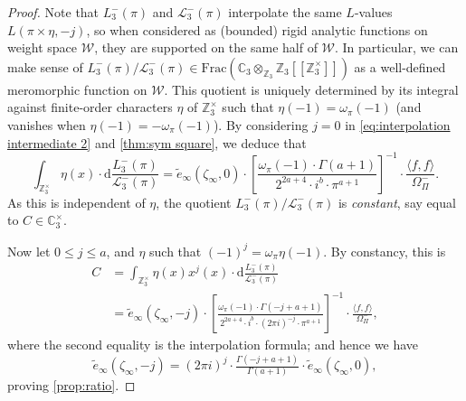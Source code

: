 \documentclass[10pt,a4paper]{amsart}
\newcommand{\C}{\mathbb{C}}
\newcommand{\Z}{\mathbb{Z}}
\newcommand{\cL}{\mathcal{L}}
\newcommand{\sW}{\mathscr{W}}
\begin{document}
\begin{proof}
Note that $L_3^-(\pi)$ and $\cL_3^-(\pi)$ interpolate the same $L$-values $L(\pi\times\eta,-j)$, so when considered as (bounded) rigid analytic functions on weight space $\sW$, they are supported on the same half of $\sW$. In particular, we can make sense of $L_3^-(\pi)/\cL_3^-(\pi) \in \mathrm{Frac}(\C_3\otimes_{\Z_3}\Z_3[\![\Z_3^\times]\!])$ as a well-defined meromorphic function on $\sW$. This quotient is uniquely determined by its integral against finite-order characters $\eta$ of $\Z_3^\times$ such that $\eta(-1) = \omega_\pi(-1)$ (and vanishes when $\eta(-1) = - \omega_\pi(-1)$). By considering $j = 0$ in \eqref{eq:interpolation intermediate 2} and \cref{thm:sym square}, we deduce that
\[
\int_{\Z_3^\times} \eta(x) \cdot \mathrm{d}\frac{L_3^-(\pi)}{\cL_3^-(\pi)} =  \widetilde{e}_\infty(\zeta_\infty,0) \cdot \left[\frac{\omega_\pi(-1)\cdot \Gamma(a+1)}{2^{2a+4}\cdot i^b \cdot \pi^{a+1}}\right]^{-1} \cdot \frac{\langle f,f\rangle}{\Omega_\Pi^-}.
\]
As this is independent of $\eta$, the quotient $L_3^-(\pi)/\cL_3^-(\pi)$ is \emph{constant}, say equal to $C \in \C_3^\times$.

Now let $0 \leq j \leq a$, and $\eta$ such that $(-1)^j = \omega_\pi\eta(-1)$. By constancy, this is
\begin{align*}
C &= \int_{\Z_3^\times} \eta(x)x^{j}(x) \cdot \mathrm{d}\frac{L_3^-(\pi)}{\cL_3^-(\pi)}\\
&= \widetilde{e}_\infty(\zeta_\infty,-j)\cdot\left[ \frac{\omega_\pi(-1)\cdot \Gamma(-j+a+1)}{2^{2a+4}\cdot i^b \cdot (2\pi i)^{-j}\cdot \pi^{a+1}}\right]^{-1}  \cdot \frac{\langle f,f\rangle}{\Omega_\Pi^-},
\end{align*}
where the second equality is the interpolation formula; and hence we have
\begin{equation}\label{eq:ratio}
\widetilde{e}_\infty(\zeta_\infty,-j) = (2\pi i)^{j} \cdot \tfrac{\Gamma(-j+a+1)}{\Gamma(a+1)} \cdot \widetilde{e}_\infty(\zeta_\infty,0),
\end{equation}
proving \cref{prop:ratio}.
\end{proof}
\end{document}
